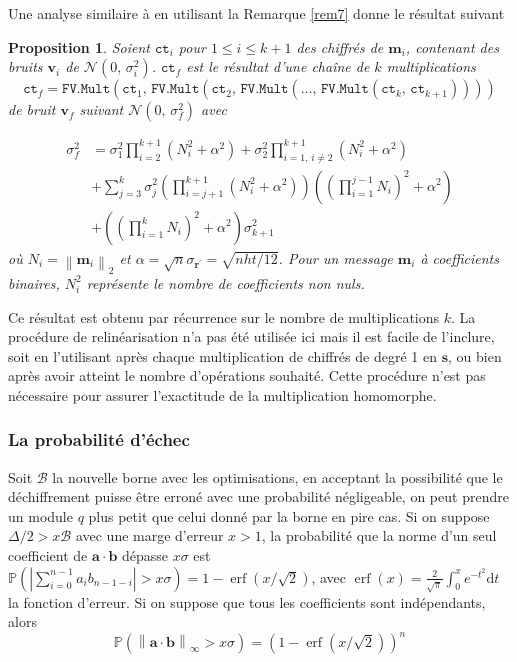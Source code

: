 \documentclass[11pt, headsepline, a4paper, fleqn, oneside]{article}
\newtheorem{prop}{Proposition}
\begin{document}
Une analyse similaire à \cite{cryptoeprint:2016:254} en utilisant la Remarque \ref{rem7} donne le résultat suivant
\begin{prop}
Soient $\texttt{ct}_i$ pour $1\leq i \leq k+1$ des chiffrés de $\boldsymbol{m}_i$, contenant des bruits $\boldsymbol{v}_i$ de $\mathcal{N}(0,\,\sigma_i ^2)$. $\texttt{ct}_f$ est le résultat d'une chaîne de $k$ multiplications 
$$\texttt{ct}_{f}=\texttt{FV.Mult}\left(\texttt{ct}_{1},\, \texttt{FV.Mult}\left(\texttt{ct}_{2},\,\texttt{FV.Mult}\left(\dots,\, \texttt{FV.Mult}\left(\texttt{ct}_{k},\, \texttt{ct}_{k+1}\right)\right) \right) \right)$$
de bruit $\boldsymbol{v}_f$ suivant $\mathcal{N}(0,\,\sigma_f ^2)$ avec 

$$\begin{aligned}
\sigma_f ^2 &= \sigma_1 ^2 \prod_{i=2}^{k+1}(N_i ^2 + \alpha^2) + \sigma_2 ^2 \prod_{i=1,\,i\neq2}^{k+1}(N_i ^2 + \alpha^2) \\&+{\sum_{j=3}^{k} \sigma_j ^2(\prod_{i=j+1}^{k+1} (N_i ^2 + \alpha^2))((\prod_{i=1}^{j-1} N_i )^2 + \alpha^2 )} \\&+ { ((\prod_{i=1}^{k} N_i )^2 + \alpha^2 )\sigma_{k+1} ^2}
\end{aligned}$$
où $N_i = \left\|\boldsymbol{m}_i \right\|_2$ et $\alpha = \sqrt{n}\sigma_{\boldsymbol{r}^\prime} = \sqrt{nht/12}$. Pour un message $\boldsymbol{m}_i$ à coefficients binaires, $N_i ^2$ représente le nombre de coefficients non nuls.

\end{prop}
Ce résultat est obtenu par récurrence sur le nombre de multiplications $k$. La procédure de relinéarisation n'a pas été utilisée ici mais il est facile de l'inclure, soit en l'utilisant après chaque multiplication de chiffrés de degré 1 en $\boldsymbol{s}$, ou bien après avoir atteint le nombre d'opérations souhaité. Cette procédure n'est pas nécessaire pour assurer l'exactitude de la multiplication homomorphe.

\subsubsection{La probabilité d'échec}
Soit $\mathcal{B}$ la nouvelle borne avec les optimisations, en acceptant la possibilité que le déchiffrement puisse être erroné avec une probabilité négligeable, on peut prendre un module $q$ plus petit que celui donné par la borne en pire cas. Si on suppose $\Delta/2 > x\mathcal{B}$ avec une marge d'erreur $x>1$, la probabilité que la norme d'un seul coefficient de $\boldsymbol{a}\cdot \boldsymbol{b}$ dépasse $x\sigma$ est $\mathbb{P}\left(\left|\sum_{i=0}^{n-1} a_{i} b_{n-1-i}\right|>x \sigma\right) = 1-\operatorname{erf}(x / \sqrt{2})$, avec $\operatorname{erf}(x)=\frac{2}{\sqrt{\pi}} \int_{0}^{x} e^{-t^{2}} \mathrm{d} t$ la fonction d'erreur. Si on suppose que tous les coefficients sont indépendants, alors $$\mathbb{P}\left(\left\|\boldsymbol{a}\cdot\boldsymbol{b}\right\|_{\infty}>x \sigma\right) = \left(1-\operatorname{erf}(x /\sqrt{2})\right)^n$$
\end{document}
